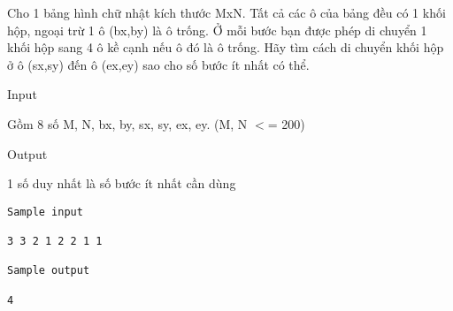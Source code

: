 

Cho 1 bảng hình chữ nhật kích thước MxN. Tất cả các ô của bảng đều có 1 khối hộp, ngoại trừ 1 ô (bx,by) là ô trống. Ở mỗi bước bạn được phép di chuyển 1 khối hộp sang 4 ô kề cạnh nếu ô đó là ô trống. Hãy tìm cách di chuyển khối hộp ở ô (sx,sy) đến ô (ex,ey) sao cho số bước ít nhất có thể.

Input

Gồm 8 số M, N, bx, by, sx, sy, ex, ey. (M, N $<$= 200)

Output

1 số duy nhất là số bước ít nhất cần dùng
\begin{verbatim}
Sample input

3 3 2 1 2 2 1 1

Sample output

4\end{verbatim}